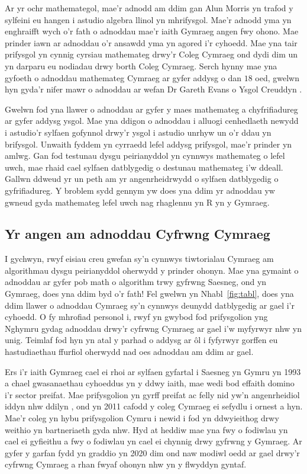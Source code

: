 Ar yr ochr mathemategol, mae'r adnodd am ddim gan Alun Morris \cite{Algebra-llinol} yn trafod y sylfeini eu hangen i astudio algebra llinol yn mhrifysgol. Mae'r adnodd yma yn enghraifft wych o'r fath o adnoddau mae'r iaith Gymraeg angen fwy ohono. Mae prinder iawn ar adnoddau o'r ansawdd yma yn agored i'r cyhoedd. Mae yna tair prifysgol yn cynnig cyrsiau mathemateg drwy'r Coleg Cymraeg ond dydi dim un yn darparu eu nodiadau drwy borth Coleg Cymraeg. 
Serch hynny mae yna gyfoeth o adnoddau mathemateg Cymraeg ar gyfer addysg o dan $18$ oed, gwelwn hyn gyda'r nifer mawr o adnoddau ar wefan Dr Gareth Evans o Ysgol Creuddyn \cite{mathemateg}.  

Gwelwn fod yna llawer o adnoddau ar gyfer y maes mathemateg a chyfrifiadureg ar gyfer addysg ysgol. Mae yna ddigon o adnoddau i alluogi cenhedlaeth newydd i astudio'r sylfaen gofynnol drwy'r ysgol i astudio unrhyw un o'r ddau yn brifysgol. Unwaith fyddem yn cyrraedd lefel addysg prifysgol, mae'r prinder yn amlwg. Gan fod testunau dysgu peirianyddol yn cynnwys mathemateg o lefel uwch, mae rhaid cael sylfaen datblygedig o destunau mathemateg i'w ddeall. Gallwn ddweud yr un peth am yr angenrheidrwydd o sylfaen datblygedig o gyfrifiadureg. Y broblem sydd gennym yw does yna ddim yr adnoddau yw gwneud gyda mathemateg lefel uwch nag rhaglennu yn R yn y Gymraeg.

\subsection{Yr angen am adnoddau Cyfrwng Cymraeg}

I gychwyn, rwyf eisiau creu gwefan sy'n cynnwys tiwtorialau Cymraeg am algorithmau dysgu peirianyddol oherwydd y prinder ohonyn. Mae yna gymaint o adnoddau ar gyfer pob math o algorithm trwy gyfrwng Saesneg, ond yn Gymraeg, does yna ddim byd o'r fath! Fel gwelwn yn Nhabl~\ref{fig:tabl}, does yna ddim llawer o adnoddau Cymraeg sy'n cynnwys deunydd datblygedig ar gael i'r cyhoedd. O fy mhrofiad personol i, rwyf yn gwybod fod prifysgolion yng Nghymru gydag adnoddau drwy'r cyfrwng Cymraeg ar gael i'w myfyrwyr nhw yn unig. Teimlaf fod hyn yn atal y parhad o addysg ar \^{o}l i fyfyrwyr gorffen eu hastudiaethau ffurfiol oherwydd nad oes adnoddau am ddim ar gael. 

Ers i'r iaith Gymraeg cael ei rhoi ar sylfaen gyfartal i Saesneg yn Gymru yn 1993 a chael gwasanaethau cyhoeddus yn y ddwy iaith, mae wedi bod effaith domino i'r sector preifat. Mae prifysgolion yn gyrff preifat ac felly nid yw'n angenrheidiol iddyn nhw ddilyn \cite{prifysgolion}, ond yn 2011 cafodd y coleg Cymraeg ei sefydlu i ornest a hyn. Mae'r coleg yn hybu prifysgolion Cymru i newid i fod yn ddwyieithog drwy weithio yn bartneriaeth gyda nhw. Hyd at heddiw mae yna fwy o fodiwlau yn cael ei gyfieithu a fwy o fodiwlau yn cael ei chynnig drwy gyfrwng y Gymraeg. Ar gyfer y garfan fydd yn graddio yn 2020 dim ond naw modiwl oedd ar gael drwy'r cyfrwng Cymraeg a rhan fwyaf ohonyn nhw yn y flwyddyn gyntaf.

